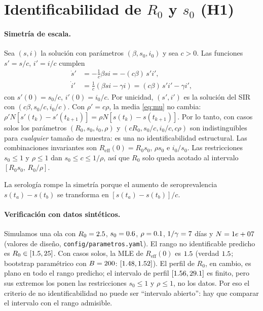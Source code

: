 \section{Identificabilidad de $R_0$ y $s_0$ (H1)}

\paragraph{Simetría de escala.}
Sea $(s,i)$ la solución con parámetros $(\beta, s_0, i_0)$ y sea $c>0$.
Las funciones $s' = s/c$, $i' = i/c$ cumplen
\begin{align*}
  \dot s' &= -\tfrac{1}{c}\beta s i = -(c\beta)\, s' i', \\
  \dot i' &= \tfrac{1}{c}(\beta s i - \gamma i) = (c\beta)\, s' i' - \gamma i',
\end{align*}
con $s'(0)=s_0/c$, $i'(0)=i_0/c$. Por unicidad, $(s',i')$ es la solución
del SIR con $(c\beta, s_0/c, i_0/c)$. Con $\rho' = c\rho$, la media
\eqref{eq:mu} no cambia:
$\rho' N [s'(t_k)-s'(t_{k+1})] = \rho N [s(t_k)-s(t_{k+1})]$.
Por lo tanto, con casos solos los parámetros
$(R_0, s_0, i_0, \rho)$ y $(cR_0, s_0/c, i_0/c, c\rho)$ son
indistinguibles para \emph{cualquier} tamaño de muestra: es una
no identificabilidad estructural. Las combinaciones invariantes son
$R_{\mathrm{eff}}(0)=R_0 s_0$, $\rho s_0$ e $i_0/s_0$. Las restricciones
$s_0\le 1$ y $\rho\le 1$ dan $s_0 \le c \le 1/\rho$, así que $R_0$ solo
queda acotado al intervalo $[R_0 s_0,\, R_0/\rho]$.

La serología rompe la simetría porque el aumento de seroprevalencia
$s(t_a)-s(t_b)$ se transforma en $[s(t_a)-s(t_b)]/c$.

\paragraph{Verificación con datos sintéticos.}
Simulamos una ola con $R_0=2.5$, $s_0=0.6$,
$\rho=0.1$, $1/\gamma=7$ días y
$N=1e+07$ (valores de diseño, \texttt{config/parametros.yaml}). El rango
no identificable predicho es $R_0\in[1.5,25]$.
Con casos solos, la MLE de $R_{\mathrm{eff}}(0)$ es $1.5$
(verdad $1.5$; bootstrap paramétrico con $B=200$:
$[1.48, 1.52]$). El perfil de $R_0$, en
cambio, es plano en todo el rango predicho; el intervalo de perfil
$[1.56, 29.1]$ es finito, pero sus
extremos los ponen las restricciones $s_0\le1$ y $\rho\le1$, no los datos.
Por eso el criterio de no identificabilidad no puede ser ``intervalo
abierto'': hay que comparar el intervalo con el rango admisible.

